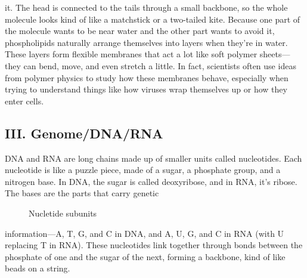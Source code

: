 \documentclass[12pt]{article}
\begin{document}
\begin{flushleft}
\noindent it. The head is connected to the tails through a small backbone, so the whole molecule looks kind of like a matchstick or a two-tailed kite. Because one part of the molecule wants to be near water and the other part wants to avoid it, phospholipids naturally arrange themselves into layers when they’re in water. These layers form flexible membranes that act a lot like soft polymer sheets—they can bend, move, and even stretch a little. In fact, scientists often use ideas from polymer physics to study how these membranes behave, especially when trying to understand things like how viruses wrap themselves up or how they enter cells.


\subsection*{III. Genome/DNA/RNA}
DNA and RNA are long chains made up of smaller units called nucleotides. Each nucleotide is like a puzzle piece, made of a sugar, a phosphate group, and a nitrogen base. In DNA, the sugar is called deoxyribose, and in RNA, it’s ribose. The bases are the parts that carry genetic 

\begin{figure}[!ht]
  \centering
  

  \caption{Nucletide subunits}
\end{figure}


\noindent information—A, T, G, and C in DNA, and A, U, G, and C in RNA (with U replacing T in RNA). These nucleotides link together through bonds between the phosphate of one and the sugar of the next, forming a backbone, kind of like beads on a string. 






\end{flushleft}
\end{document}
